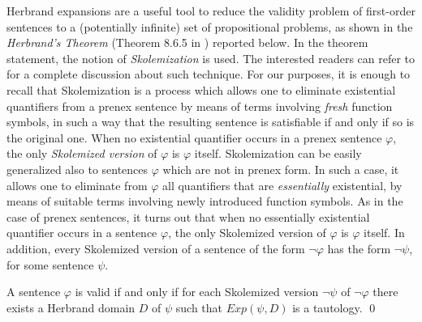 \documentclass[a4paper]{llncs}
\newcommand{\HExp}{Exp}
\begin{document}
Herbrand expansions are a useful tool to reduce the validity
problem of first-order sentences to a (potentially infinite) set of
propositional problems, as shown in the \emph{Herbrand's Theorem}
(Theorem 8.6.5 in \cite{Fitting96}) reported below.
In the theorem statement, the notion of \emph{Skolemization} is
used. The interested readers can refer to \cite{NonWei2001}
for a complete discussion about such technique.
For our purposes, it is enough to recall that Skolemization is
a process which allows one to eliminate existential quantifiers from 
a prenex sentence by means of terms involving \emph{fresh} function 
symbols, in such a way that the resulting sentence is satisfiable if 
and only if so is the
original one. When no existential quantifier occurs in a prenex 
sentence $\varphi$, the only \emph{Skolemized version} of $\varphi$ is
$\varphi$ itself. Skolemization can be easily generalized also to 
sentences $\varphi$ which are not in prenex form. In such a case, it 
allows one to eliminate from $\varphi$ all quantifiers that are 
\emph{essentially} existential, by means of suitable terms involving 
newly introduced function symbols. As in the case of prenex 
sentences, it turns out that
when no essentially existential quantifier occurs in a sentence 
$\varphi$, the only Skolemized version of $\varphi$ is $\varphi$ 
itself. In addition, every Skolemized version of a sentence of the 
form $\neg \varphi$ has the form $\neg \psi$, for some sentence 
$\psi$.


\begin{theorem}\label{HERVAL}
A sentence $\varphi$ is valid if and only if for each Skolemized 
version $\neg \psi$ of $\neg \varphi$ there exists a Herbrand domain 
$D$ of $\psi$ such that $\HExp(\psi, D)$ is a tautology. \qed
%
\end{theorem}
\end{document}
